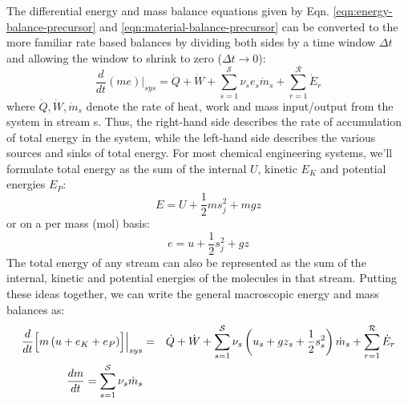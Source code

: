 \documentclass[11pt]{article}
\theoremstyle{definition}
\begin{document}
The differential energy and mass balance equations given by Eqn. \eqref{eqn:energy-balance-precursor} and \eqref{eqn:material-balance-precursor} can be converted to
the more familiar rate based balances by dividing both sides by a time window $\Delta{t}$ and allowing the window to shrink to zero ($\Delta{t}\rightarrow{0}$):
\begin{equation}
\frac{d}{dt}\left(me\right)\Bigr|_{sys} = \dot{Q}+\dot{W}+\sum_{s=1}^{\mathcal{S}}\nu_{s}e_{s}\dot{m}_{s}+ \sum_{r=1}^{\mathcal{R}}\dot{E}_{r}
\end{equation}where $\dot{Q},\dot{W},\dot{m}_{s}$ denote the rate of heat, work and mass input/output from the system in stream s.
Thus, the right-hand side describes the rate of accumulation of total energy in the system, while the left-hand side describes the various sources and sinks of total energy.
For most chemical engineering systems, we'll formulate total energy as the sum of the internal $U$, kinetic $E_{K}$ and potential energies $E_{P}$:
\begin{equation}
E = U + \frac{1}{2}ms_{j}^{2} + mgz
\end{equation} or on a per mass (mol) basis:
\begin{equation}
e = u + \frac{1}{2}s_{j}^{2} + gz
\end{equation}The total energy of any stream can also be represented as the sum of the internal, kinetic and potential energies of the molecules in that stream.
Putting these ideas together, we can write the general macroscopic energy and mass balances as:
\begin{eqnarray}\label{eqn:general-open-balance}
	\frac{d}{dt}\Bigl[m\left(u+e_{K}+e_{P}\right)\Bigr]\Bigr|_{sys} &=& \dot{Q}+\dot{W}+\sum_{s=1}^{\mathcal{S}}\nu_{s}\left(u_{s}+gz_{s}+\frac{1}{2}s_{s}^{2}\right)\dot{m}_{s}+\sum_{r=1}^{\mathcal{R}}\dot{E}_{r}\\\label{eqn:total-mass-balance}
	\frac{dm}{dt} = \sum_{s=1}^{\mathcal{S}}\nu_{s}\dot{m}_{s}
\end{eqnarray}
\end{document}
